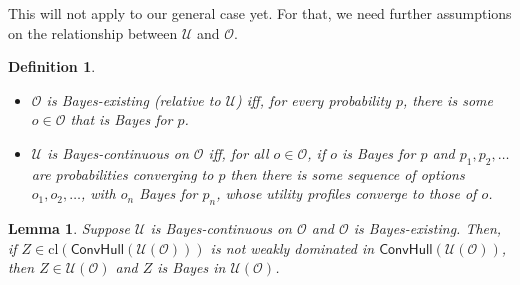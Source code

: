 \documentclass[a4paper,final]{article}
\newtheorem{definition}[theorem]{Definition}
\newtheorem{lemma}[theorem]{Lemma}
\newtheorem{corollary}[theorem]{Corollary}
\newcommand\cl{\mathrm{cl}}
\renewcommand\O{\mathcal{O}}
\newcommand\Uwald{\mathcal{U}} %
\newcommand{\Conv}{\mathsf{ConvHull}}
\newenvironment{CCM rewritten}
{\begingroup\color{blue}} %
{\endgroup}              %
\begin{document}
	
	
	
	This will not apply to our general case yet. For that, we need further assumptions on the relationship between $\Uwald$ and $\O$. 


\begin{definition}\ 
	\begin{itemize}
		\item $\O$ is \emph{Bayes-existing} (relative to $\Uwald$) iff, for every probability $p$, there is some $o\in\O$ that is Bayes for $p$.
		\item $\Uwald$ is \emph{Bayes-continuous} on $\O$ iff, for all $o\in\O$, if $o$ is Bayes for $p$ and $p_1,p_2,\ldots$ are probabilities converging to $p$ then there is some sequence of options $o_1,o_2,\ldots$, with $o_n$ Bayes for $p_n$, whose utility profiles converge to those of $o$. 
	\end{itemize}
\end{definition}
	
	\begin{lemma}\label{thm:cct:bdry are the Bayes optimal}
		Suppose $\Uwald$ is Bayes-continuous on $\O$ and $\O$ is Bayes-existing. Then, if $Z\in\cl(\Conv(\Uwald(\O)))$ is not weakly dominated in $\Conv(\Uwald(\O))$, then $Z\in \Uwald(\O)$ and $Z$ is Bayes  in $\Uwald(\O)$. 
%		
	\end{lemma}
	
\end{document}
